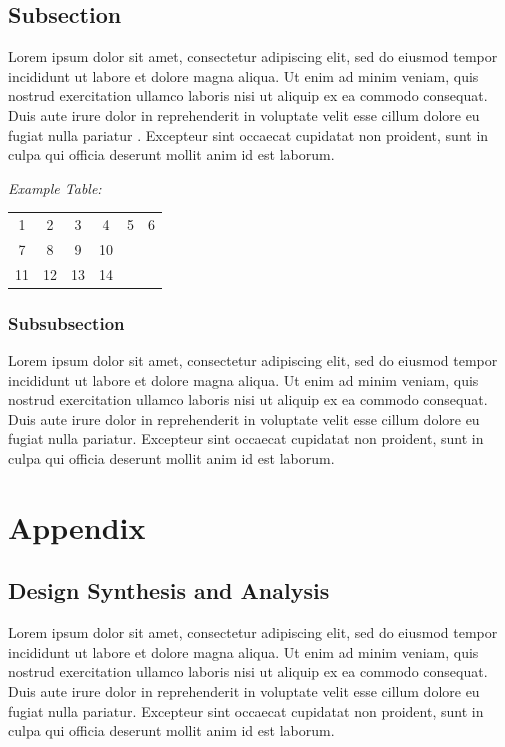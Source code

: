 \documentclass[a4paper,titlepage]{article}
\begin{document}
\subsection{Subsection}

Lorem ipsum dolor sit amet, consectetur adipiscing elit, sed do eiusmod tempor incididunt ut labore et dolore magna aliqua. Ut enim ad minim veniam, quis nostrud exercitation ullamco laboris nisi ut aliquip ex ea commodo consequat. Duis aute irure dolor in reprehenderit in voluptate velit esse cillum dolore eu fugiat nulla pariatur \cite{Example2}. Excepteur sint occaecat cupidatat non proident, sunt in culpa qui officia deserunt mollit anim id est laborum.

{\em Example Table:}

\begin{center}
\begin{tabular}{ c c c c c c}
 1 & 2 & 3 & 4 & 5 & 6\\ 
 7 & 8 & 9 & 10\\  
 11 & 12 & 13 & 14\\

\end{tabular}
\end{center}


\subsubsection{Subsubsection}

Lorem ipsum dolor sit amet, consectetur adipiscing elit, sed do eiusmod tempor incididunt ut labore et dolore magna aliqua. Ut enim ad minim veniam, quis nostrud exercitation ullamco laboris nisi ut aliquip ex ea commodo consequat. Duis aute irure dolor in reprehenderit in voluptate velit esse cillum dolore eu fugiat nulla pariatur. Excepteur sint occaecat cupidatat non proident, sunt in culpa qui officia deserunt mollit anim id est laborum.

\pagebreak

\section{Appendix}

\subsection{Design Synthesis and Analysis}

Lorem ipsum dolor sit amet, consectetur adipiscing elit, sed do eiusmod tempor incididunt ut labore et dolore magna aliqua. Ut enim ad minim veniam, quis nostrud exercitation ullamco laboris nisi ut aliquip ex ea commodo consequat. Duis aute irure dolor in reprehenderit in voluptate velit esse cillum dolore eu fugiat nulla pariatur. Excepteur sint occaecat cupidatat non proident, sunt in culpa qui officia deserunt mollit anim id est laborum.
\end{document}
